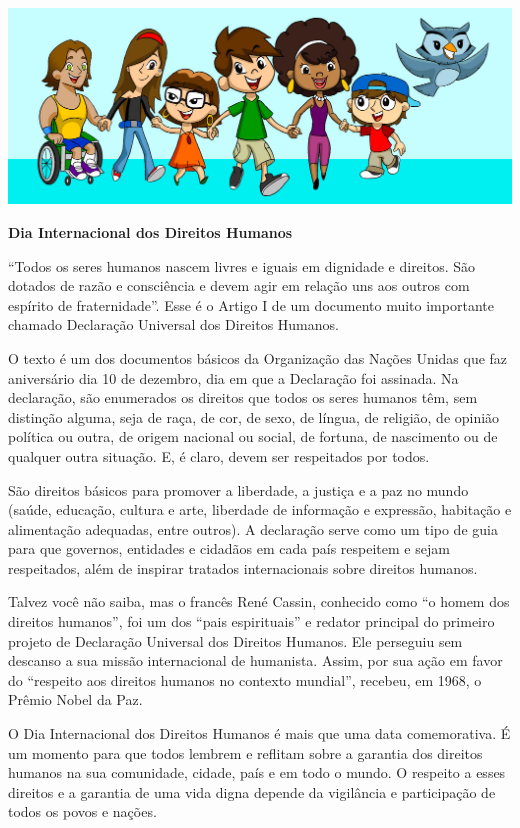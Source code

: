 \begin{myquote}
\begin{center}
\includegraphics[width=\textwidth]{media/image28.jpeg}
\end{center}

\textbf{Dia Internacional dos Direitos Humanos}

``Todos os seres humanos nascem livres e iguais em dignidade e
direitos. São dotados de razão e consciência e devem agir em relação
uns aos outros com espírito de fraternidade''. Esse é o Artigo I de um
documento muito importante chamado Declaração Universal dos Direitos
Humanos.

O texto é um dos documentos básicos da Organização das Nações Unidas que
faz aniversário dia 10 de dezembro, dia em que a Declaração foi
assinada. Na declaração, são enumerados os direitos que todos os seres
humanos têm, sem distinção alguma, seja de raça, de cor, de sexo, de
língua, de religião, de opinião política ou outra, de origem nacional ou
social, de fortuna, de nascimento ou de qualquer outra situação. E, é
claro, devem ser respeitados por todos.

São direitos básicos para promover a liberdade, a justiça e a paz no
mundo (saúde, educação, cultura e arte, liberdade de informação e
expressão, habitação e alimentação adequadas, entre outros). A
declaração serve como um tipo de guia para que governos, entidades e
cidadãos em cada país respeitem e sejam respeitados, além de inspirar
tratados internacionais sobre direitos humanos.

Talvez você não saiba, mas o francês René Cassin, conhecido como ``o
homem dos direitos humanos'', foi um dos ``pais espirituais'' e redator
principal do primeiro projeto de Declaração Universal dos Direitos
Humanos. Ele perseguiu sem descanso a sua missão internacional de
humanista. Assim, por sua ação em favor do ``respeito aos direitos
humanos no contexto mundial'', recebeu, em 1968, o Prêmio Nobel da Paz.

O Dia Internacional dos Direitos Humanos é mais que uma data
comemorativa. É um momento para que todos lembrem e reflitam sobre a
garantia dos direitos humanos na sua comunidade, cidade, país e em todo
o mundo. O respeito a esses direitos e a garantia de uma vida digna
depende da vigilância e participação de todos os povos e nações.


\end{myquote}
